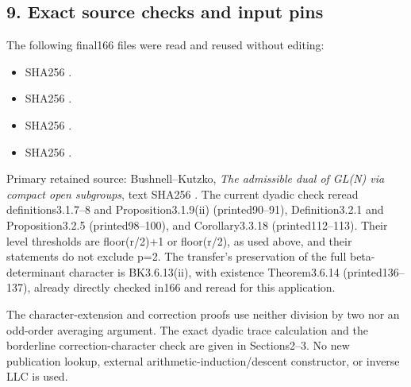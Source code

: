 \hypertarget{dyadic_character-exact-source-checks-and-input-pins}{%
\subsection{9. Exact source checks and input
pins}\label{dyadic_character-exact-source-checks-and-input-pins}}

The following final166 files were read and reused without editing:

\begin{itemize}
\tightlist
\item
  SHA256
  .
\item
   SHA256
  .
\item
   SHA256
  .
\item
   SHA256
  .
\end{itemize}

Primary retained source: Bushnell--Kutzko, \emph{The admissible dual of
GL(N) via compact open subgroups}, text SHA256
.
The current dyadic check reread definitions3.1.7--8 and
Proposition3.1.9(ii) (printed90--91), Definition3.2.1 and
Proposition3.2.5 (printed98--100), and Corollary3.3.18
(printed112--113). Their level thresholds are floor(r/2)+1 or
floor(r/2), as used above, and their statements do not exclude p=2. The
transfer's preservation of the full beta-determinant character is
BK3.6.13(ii), with existence Theorem3.6.14 (printed136--137), already
directly checked in166 and reread for this application.

The character-extension and correction proofs use neither division by
two nor an odd-order averaging argument. The exact dyadic trace
calculation and the borderline correction-character check are given in
Sections2--3. No new publication lookup, external
arithmetic-induction/descent constructor, or inverse LLC is used.

